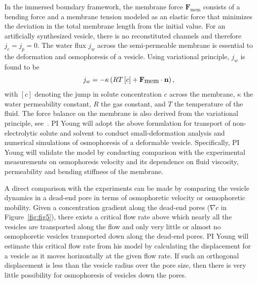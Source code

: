 \documentclass[11pt]{article}
\begin{document}
In the immersed boundary framework, the membrane force $\mathbf{F}
_{\mbox{mem}}$ consists of a bending force and a membrane tension
modeled as an elastic force that minimizes the deviation in the total
membrane length from the initial value. For an artificially synthesized
vesicle, there is no reconstituted channels and therefore $j_c=j_p=0$.
The water flux $j_w$ across the semi-permeable membrane is essential to
the deformation and osmophoresis of a vesicle.  Using variational
principle, $j_w$ is found to be
\begin{equation}
\label{eq:jw}
 j_w =-\kappa\left(RT\left[c\right] + {\bf F}_{\mbox{mem}}\cdot{\bf n}\right),
\end{equation}
with $[c]$ denoting the jump in solute concentration $c$ across the
membrane, $\kappa$ the water permeability constant, $R$ the gas
constant, and $T$ the temperature of the fluid.  The force balance on
the membrane is also derived from the variational principle,
see~\cite{YaoMori2017_JCP}.  PI Young will adopt the above formulation
for transport of non-electrolytic solute and solvent to conduct
small-deformation analysis and numerical simulations of osmophoresis of
a deformable vesicle.  Specifically, PI Young will validate the model by
conducting comparison with the experimental measurements on osmophoresis
velocity and its dependence on fluid viscosity, permeability and bending
stiffness of the membrane. 

A direct comparison with the experiments can be made by comparing the
vesicle dynamics in a dead-end pore in terms of osmophoretic velocity or
osmophoretic mobility.  Given a concentration gradient along the
dead-end pores ($\nabla c$ in Figure~\ref{fig:fig5}), there exists a
critical flow rate above which nearly all the vesicles are transported
along the flow and only very little or almost no osmophoretic vesicles
transported down along the dead-end pores.  PI Young will estimate this
critical flow rate from his model by calculating the displacement for a
vesicle as it moves horizontally at the given flow rate.  If such an
orthogonal displacement is less than the vesicle radius over the pore
size, then there is very little possibility for osmophoresis of vesicles
down the pores.
\end{document}
